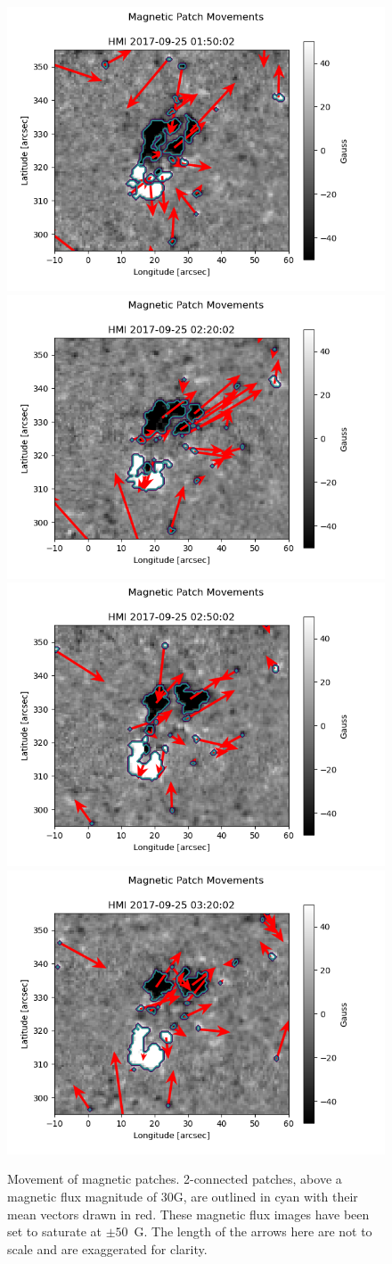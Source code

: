 \begin{figure}
    \centering
    \includegraphics[width=0.49\linewidth]{./04CBPs/figs/030.png}
    \includegraphics[width=0.49\linewidth]{./04CBPs/figs/031.png}
    \includegraphics[width=0.49\linewidth]{./04CBPs/figs/032.png}
    \includegraphics[width=0.49\linewidth]{./04CBPs/figs/033.png}
    \caption[Global Movement of 2-connected Magnetic Patches]{Movement of magnetic patches. 2-connected patches, above a magnetic flux magnitude of 30G, are outlined in cyan with their mean vectors drawn in red. These magnetic flux images have been set to saturate at $\pm50$~G. The length of the arrows here are not to scale and are exaggerated for clarity.}
    \label{fig:single_patchlabels}
\end{figure}


